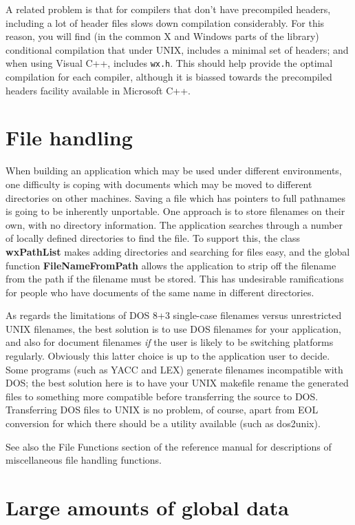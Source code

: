 A related problem is that for compilers that don't have precompiled
headers, including a lot of header files slows down compilation
considerably. For this reason, you will find (in the common
X and Windows parts of the library) conditional
compilation that under UNIX, includes a minimal set of headers;
and when using Visual C++, includes {\tt wx.h}. This should help provide
the optimal compilation for each compiler, although it is
biassed towards the precompiled headers facility available
in Microsoft C++.

\section{File handling}

When building an application which may be used under different
environments, one difficulty is coping with documents which may be
moved to different directories on other machines. Saving a file which
has pointers to full pathnames is going to be inherently unportable. One
approach is to store filenames on their own, with no directory
information.  The application searches through a number of locally
defined directories to find the file. To support this, the class {\bf
wxPathList} makes adding directories and searching for files easy, and
the global function {\bf FileNameFromPath} allows the application to
strip off the filename from the path if the filename must be stored.
This has undesirable ramifications for people who have documents of the
same name in different directories.

As regards the limitations of DOS 8+3 single-case filenames versus
unrestricted UNIX filenames, the best solution is to use DOS filenames
for your application, and also for document filenames {\it if} the user
is likely to be switching platforms regularly. Obviously this latter
choice is up to the application user to decide.  Some programs (such as
YACC and LEX) generate filenames incompatible with DOS; the best
solution here is to have your UNIX makefile rename the generated files
to something more compatible before transferring the source to DOS.
Transferring DOS files to UNIX is no problem, of course, apart from EOL
conversion for which there should be a utility available (such as
dos2unix).

See also the File Functions section of the reference manual for
descriptions of miscellaneous file handling functions.

\section{Large amounts of global data}\label{largedata}


